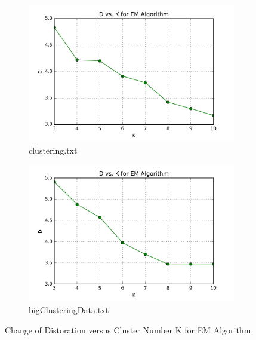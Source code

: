 \begin{figure}[H]
\centering
\centering
        \begin{subfigure}[b]{0.49\textwidth}
            \centering
            \includegraphics[width=\textwidth]{./figures/loss_clustering_EM.png}
            \caption{clustering.txt}\label{fig:15a}
        \end{subfigure}
        \hfill
        \begin{subfigure}[b]{0.49\textwidth}  
            \centering 
            \includegraphics[width=\textwidth]{./figures/loss_bigClustering_EM.png}
            \caption{bigClusteringData.txt}\label{fig:15b}
        \end{subfigure}
\caption{Change of Distoration versus Cluster Number K for EM Algorithm}
\label{fig:k-means-loss} 
\end{figure}


